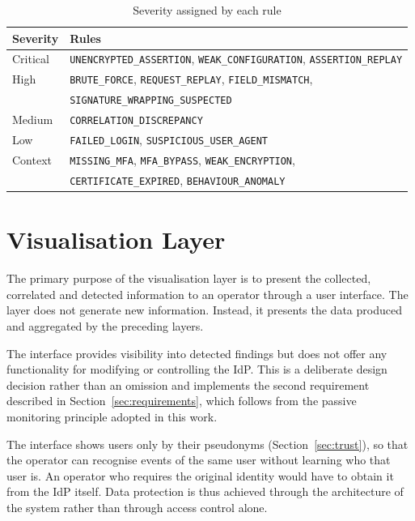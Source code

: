 \documentclass[../main.tex]{subfiles}
\begin{document}
\begin{table}[h]
\centering
\caption{Severity assigned by each rule}\label{tab:severity}
\small
\begin{tabular}{ll}
\toprule
Severity & Rules \\
\midrule
Critical & \texttt{UNENCRYPTED\_ASSERTION}, \texttt{WEAK\_CONFIGURATION}, \texttt{ASSERTION\_REPLAY} \\
High     & \texttt{BRUTE\_FORCE}, \texttt{REQUEST\_REPLAY}, \texttt{FIELD\_MISMATCH}, \\
         & \texttt{SIGNATURE\_WRAPPING\_SUSPECTED} \\
Medium   & \texttt{CORRELATION\_DISCREPANCY} \\
Low      & \texttt{FAILED\_LOGIN}, \texttt{SUSPICIOUS\_USER\_AGENT} \\
Context  & \texttt{MISSING\_MFA}, \texttt{MFA\_BYPASS}, \texttt{WEAK\_ENCRYPTION}, \\
         & \texttt{CERTIFICATE\_EXPIRED}, \texttt{BEHAVIOUR\_ANOMALY} \\
\bottomrule
\end{tabular}
\end{table}

\section{Visualisation Layer}\label{sec:visualisation}

The primary purpose of the visualisation layer is to present the collected, correlated and 
detected information to an operator through a user interface. 
The layer does not generate new information. 
Instead, it presents the data produced and aggregated by the preceding layers. 

The interface provides visibility into detected findings but does not offer any 
functionality for modifying or controlling the IdP. 
This is a deliberate design decision rather than an omission and implements the second 
requirement described in Section~\ref{sec:requirements}, which follows from the passive 
monitoring principle adopted in this work.

The interface shows users only by their pseudonyms (Section~\ref{sec:trust}), so that the operator 
can recognise events of the same user without learning who that user is. 
An operator who requires the original identity would have to obtain it from the IdP itself. 
Data protection is thus achieved through the architecture of the system rather than through 
access control alone. 
\end{document}
